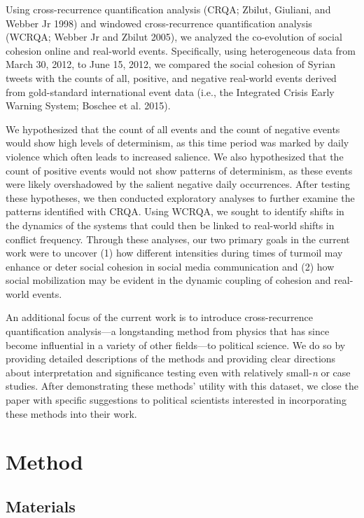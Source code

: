 \documentclass[
  english,
  man]{apa6}
\begin{document}
Using cross-recurrence quantification analysis (CRQA; Zbilut, Giuliani, and Webber Jr 1998) and
windowed cross-recurrence quantification analysis (WCRQA; Webber Jr and Zbilut 2005), we analyzed the co-evolution of social cohesion online
and real-world events. Specifically, using heterogeneous data from March 30,
2012, to June 15, 2012, we compared the social cohesion of Syrian tweets with
the counts of all, positive, and negative real-world events derived from
gold-standard international event data (i.e., the Integrated Crisis Early
Warning System; Boschee et al. 2015).

We hypothesized that the count of all events and the count of negative events
would show high levels of determinism, as this time period was marked by daily
violence which often leads to increased salience. We also hypothesized that the
count of positive events would not show patterns of determinism, as these events
were likely overshadowed by the salient negative daily occurrences. After
testing these hypotheses, we then conducted exploratory analyses to further
examine the patterns identified with CRQA. Using WCRQA, we sought to identify
shifts in the dynamics of the systems that could then be linked to real-world
shifts in conflict frequency. Through these analyses, our two primary goals in
the current work were to uncover (1) how different intensities during times of
turmoil may enhance or deter social cohesion in social media communication and
(2) how social mobilization may be evident in the dynamic coupling of cohesion
and real-world events.

An additional focus of the current work is to introduce cross-recurrence
quantification analysis---a longstanding method from physics that has since
become influential in a variety of other fields---to political science. We do so
by providing detailed descriptions of the methods and providing clear directions
about interpretation and significance testing even with relatively small-\emph{n} or
case studies. After demonstrating these methods' utility with this dataset, we
close the paper with specific suggestions to political scientists interested in
incorporating these methods into their work.

\hypertarget{method}{%
\section{Method}\label{method}}

\hypertarget{materials}{%
\subsection{Materials}\label{materials}}
\end{document}
